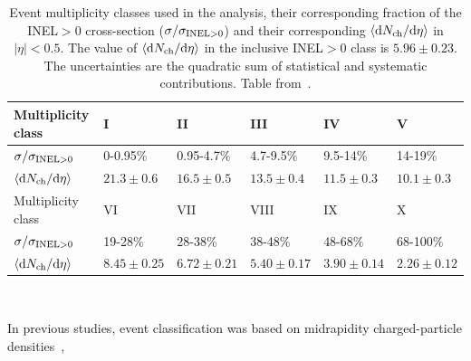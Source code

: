 \begin{table}[htbp]
\centering
\begin{tabular}{llllll} \hline \hline
Multiplicity class & I               & II              & III             & IV              & V               \\ \hline
$\sigma/\sigma_{\rm INEL>0}$      & 0-0.95\%        & 0.95-4.7\%      & 4.7-9.5\%       & 9.5-14\%        & 14-19\%         \\
$\langle {\rm d }N_{\rm  ch}/{\rm d }\eta \rangle$       & $21.3 \pm 0.6$  & $16.5 \pm 0.5$  & $13.5 \pm 0.4$  & $11.5 \pm 0.3$  & $10.1 \pm 0.3$  \\ \hline \hline
Multiplicity class                       & VI              & VII             & VIII            & IX              & X               \\ \hline
$\sigma/\sigma_{\rm INEL>0}$      & 19-28\%         & 28-38\%         & 38-48\%         & 48-68\%         & 68-100\%        \\
$\langle {\rm d }N_{\rm ch}/{\rm d }\eta \rangle$       & $8.45 \pm 0.25$ & $6.72 \pm 0.21$ & $5.40 \pm 0.17$ & $3.90 \pm 0.14$ & $2.26 \pm 0.12$ \\ \hline \hline
\end{tabular}
  ~\newline
\caption[Event classes]{Event multiplicity classes used in the analysis, their corresponding fraction of the INEL$>$0 cross-section ($\sigma/\sigma_{\rm INEL>0}$) and their corresponding $\langle {\rm d }N_{\rm ch}/{\rm d }\eta \rangle$ in $|\eta|<0.5$. The value of $\langle {\rm d }N_{\rm ch}/{\rm d }\eta \rangle$ in the inclusive INEL$>$0 class is $5.96 \pm 0.23$. The uncertainties are the quadratic sum of statistical and systematic contributions. Table from~\cite{Adam:2016emw}.}
\label{tab:OverviewEventClasses}
\end{table}

In previous studies, event classification was based on  midrapidity charged-particle densities~\cite{Abelev2012165, Abelev2013371, Adam:2015pza},

